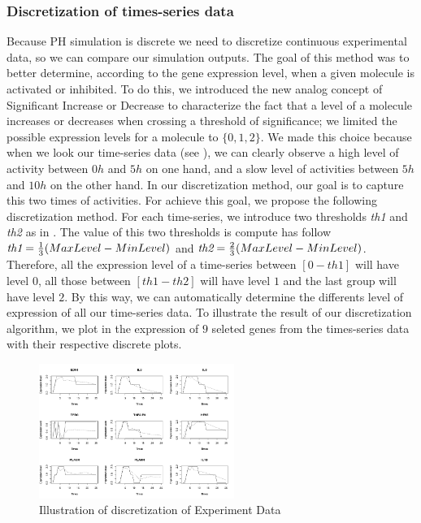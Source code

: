 \subsubsection{Discretization of times-series data}

Because PH simulation is discrete we need to discretize continuous experimental data, so we can compare our simulation outputs.
The goal of this method was to better determine, according to the gene expression level, when  a given molecule is activated or inhibited.
To do this, we introduced the new analog concept of Significant Increase or Decrease to characterize the fact that a level of a molecule 
increases or decreases when crossing a threshold of significance; we limited the possible expression levels for a molecule to
$\{0, 1, 2\}$. We made this choice because when we look our time-series data (see ), we can clearly observe a high level of
activity between $0h$ and $5h$ on one hand, and a slow level of activities between $5h$ and $10h$ on the other hand. In our discretization
method, our goal is to capture this two times of activities. For achieve this goal, we propose the following discretization method.
For each time-series, we introduce two thresholds \emph{th1} and \emph{th2} as in . The value of this two
thresholds is compute has follow $\emph{th1}=\frac{1}{3}(MaxLevel-MinLevel)$ and $\emph{th2}=\frac{2}{3}(MaxLevel-MinLevel)$. Therefore, all
the expression level of a time-series between $[0-th1]$ will have level $0$, all those between $[th1-th2]$ will have level $1$ and the last group will
have level $2$. By this way, we can automatically determine the differents level of expression of all our time-series data. 
To illustrate the result of our discretization algorithm, we plot in  the expression 
of $9$ seleted genes from the times-series data with their respective discrete plots. 

\begin{figure}[!t]
 \centering
 \includegraphics[width=2.5in]{images/ResultDiscretization.png}
 \caption{Illustration of discretization of Experiment Data }
 \label{fig:illustrationDiscretisation}
\end{figure}


